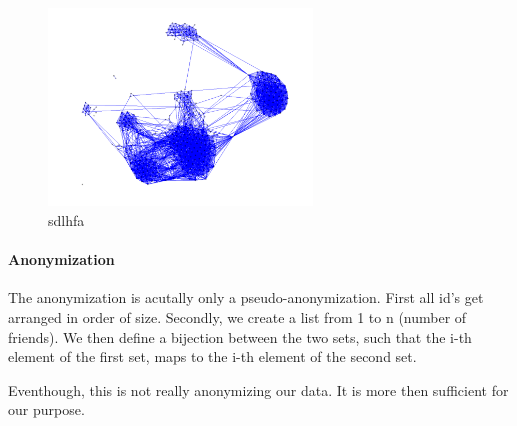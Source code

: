 \begin{figure}
\begin{center}
\includegraphics[width=7cm]{Network-Graph}
\caption{sdlhfa}
\label{Network-Graph}
\end{center}
\end{figure}

\paragraph{Anonymization}

The anonymization is acutally only a pseudo-anonymization. First all id's get arranged in order of size. Secondly, we create a list from 1 to n (number of friends). We then define a bijection between the two sets, such that the i-th element of the first set, maps to the i-th element of the second set. 

Eventhough, this is not really anonymizing our data. It is more then sufficient for our purpose. 




